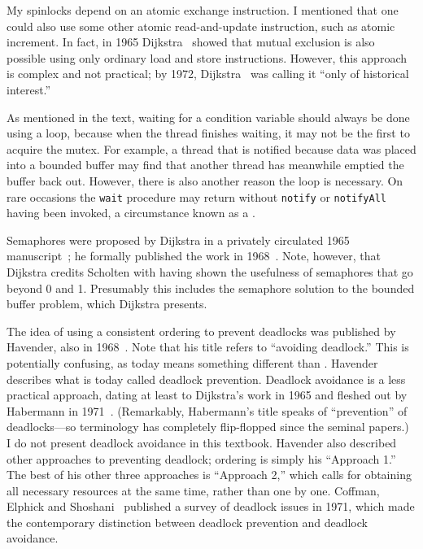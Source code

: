 My spinlocks depend on an atomic exchange instruction.  I mentioned
that one could also use some other atomic read-and-update instruction,
such as atomic increment.  In fact, in 1965 Dijkstra~\cite{max1000}
showed that mutual exclusion is also possible using only ordinary load
and store instructions.  However, this approach is complex and not
practical; by 1972, Dijkstra~\cite{max993} was calling it ``only of
historical interest.''

As mentioned in the text, waiting for a condition variable should always be done using a loop,
because when the thread finishes waiting, it may not be the first
to acquire the mutex.  For example, a thread that is notified because
data was placed into a bounded buffer may find that another thread has
meanwhile emptied the buffer back out.  However, there is also another reason the loop is necessary. On rare occasions the \texttt{wait} procedure may return without \verb|notify| or \verb|notifyAll| having been invoked, a circumstance known as a .

Semaphores were proposed by Dijkstra in a privately circulated 1965
manuscript~\cite{max987}; he formally published the work in
1968~\cite{max988}.  Note, however, that Dijkstra credits
Scholten
with having shown the usefulness of semaphores that go beyond 0 and
1.  Presumably this includes the semaphore solution to the bounded
buffer problem, which Dijkstra presents.

The idea of using a consistent ordering to prevent deadlocks was
published by Havender, also in 1968~\cite{max989}.  Note that his
title refers to ``avoiding deadlock.''  This is potentially confusing,
as today  means something different than
.  Havender describes what is today called
deadlock prevention.  Deadlock avoidance is a less practical approach,
dating at least to Dijkstra's work in 1965 and fleshed out by
Habermann in 1971~\cite{max999}. (Remarkably, Habermann's title speaks
of ``prevention'' of deadlocks---so terminology has completely
flip-flopped since the seminal papers.)  I do not present deadlock
avoidance in this textbook.  Havender also described other approaches
to preventing deadlock; ordering is simply his ``Approach 1.''  The
best of his other three approaches is ``Approach 2,'' which calls for
obtaining all necessary resources at the same time, rather than one by
one.  Coffman, Elphick and Shoshani~\cite{max998} published a survey
of deadlock issues in 1971, which made the contemporary distinction
between deadlock prevention and deadlock avoidance.

